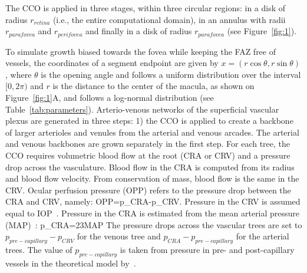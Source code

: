 \documentclass[11pt,]{article}
\let\oldequation\equation
\let\oldendequation\endequation
\renewenvironment{equation}
  {\linenomathNonumbers\oldequation}
  {\oldendequation\endlinenomath}
\begin{document}
The CCO is applied in three stages, within three circular regions: in
a disk of radius $r_{retina}$ (i.e., the entire computational domain), in an annulus with radii $r_{parafovea}$ and $r_{perifovea}$
and finally in a disk of radius $r_{parafovea}$
(see Figure~\ref{fig:1}).

To simulate growth biased towards the fovea while keeping the FAZ free
of vessels, the coordinates of a segment endpoint are given by
$x=(r\cos\theta, r\sin\theta)$, where $\theta$ is the opening angle and follows a uniform
distribution over the interval $[0,2\pi)$ and $r$ is the distance to the center of the macula, as shown on Figure~\ref{fig:1}A, and follows a log-normal distribution (see Table~\ref{tab:parameters}). Arterio-venous
networks of the superficial vascular plexus are generated in three
steps: 1) the CCO is applied to create a backbone of larger arterioles
and venules from the arterial and venous arcades. The arterial and
venous backbones are grown separately in the first step. For each
tree, the CCO requires volumetric blood flow at the root (CRA or CRV)
and a pressure drop across the vasculature. Blood flow in the CRA is
computed from its radius and blood flow velocity. From conservation of
mass, blood flow is the same in the CRV.
Ocular perfusion pressure (OPP) refers to the pressure drop between the CRA and CRV, namely:
\begin{equation}
OPP=p_{CRA}-p_{CRV}.\label{eq:OPP}
\end{equation}
Pressure in the CRV is assumed equal to IOP~\cite{Arciero2013,Guidoboni2014,Zheng2010}.
Pressure in the CRA is estimated from the mean arterial pressure (MAP)~\cite{Arciero2013,Guidoboni2014,Zheng2010}:
\begin{equation}
p_{CRA}=\frac23MAP\label{eq:pCRA}
\end{equation}
The pressure drops across the vascular trees are set to
$p_{pre-capillary}-p_{CRV}$ for the venous tree and
$p_{CRA}-p_{pre-capillary}$ for the arterial trees. The value of
$p_{pre-capillary}$ is taken from pressure in pre- and post-capillary vessels in
the theoretical model by~\cite{Takahashi2009}. %
\end{document}
